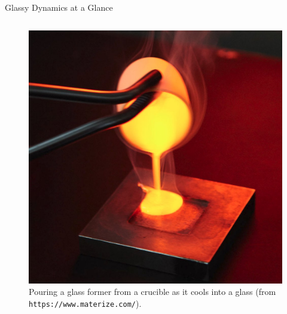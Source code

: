 \begin{frame}{Glassy Dynamics at a Glance}


\begin{columns}%
%
\begin{column}{0.5\linewidth}
\begin{figure}
\begin{overprint}
    \centering\includegraphics[height=0.675\textheight]{intro_glassy/IMG_4862.jpg}
    \caption{Pouring a glass former from a crucible as it cools into a glass (from \texttt{https://www.materize.com/}).}
    

\end{overprint}
\end{figure}
\end{column}
\end{columns}
\end{frame}
